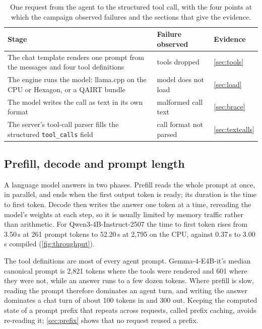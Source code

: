 \documentclass[11pt]{article}
\begin{document}
\begin{table}[tbp]
\centering
\caption{One request from the agent to the structured tool call, with the four points at which the campaign observed failures and the sections that give the evidence.}
\label{tab:route}
\small
\begin{tabularx}{\linewidth}{@{}Lll@{}}
\toprule
Stage & Failure observed & Evidence \\
\midrule
The chat template renders one prompt from the messages and four tool definitions & tools dropped & \cref{sec:tools} \\
The engine runs the model: llama.cpp on the CPU or Hexagon, or a QAIRT bundle & model does not load & \cref{sec:load} \\
The model writes the call as text in its own format & malformed call text & \cref{sec:brace} \\
The server's tool-call parser fills the structured \texttt{tool\_calls} field & call format not parsed & \cref{sec:textcalls} \\
\bottomrule
\end{tabularx}
\end{table}

\subsection{Prefill, decode and prompt length}\label{sec:phases}

A language model answers in two phases. Prefill reads the whole prompt at once, in parallel, and ends when the first output token is ready; its duration is the time to first token. Decode then writes the answer one token at a time, rereading the model's weights at each step, so it is usually limited by memory traffic rather than arithmetic. For Qwen3-4B-Instruct-2507 the time to first token rises from 3.50\,s at 261 prompt tokens to 52.20\,s at 2,795 on the CPU, against 0.37\,s to 3.00\,s compiled (\cref{fig:throughput}).

The tool definitions are most of every agent prompt. Gemma-4-E4B-it's median canonical prompt is 2,821 tokens where the tools were rendered and 601 where they were not, while an answer runs to a few dozen tokens. Where prefill is slow, reading the prompt therefore dominates an agent turn, and writing the answer dominates a chat turn of about 100 tokens in and 300 out. Keeping the computed state of a prompt prefix that repeats across requests, called prefix caching, avoids re-reading it; \cref{sec:prefix} shows that no request reused a prefix.
\end{document}

